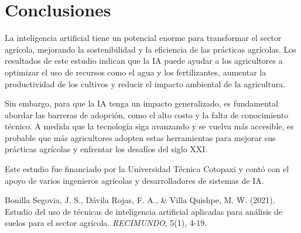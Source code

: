 \documentclass[9pt,twocolumn,twoside]{opticajnl}
\begin{document}
\section{Conclusiones}
La inteligencia artificial tiene un potencial enorme para transformar el sector agrícola, mejorando la sostenibilidad y la eficiencia de las prácticas agrícolas. Los resultados de este estudio indican que la IA puede ayudar a los agricultores a optimizar el uso de recursos como el agua y los fertilizantes, aumentar la productividad de los cultivos y reducir el impacto ambiental de la agricultura.

Sin embargo, para que la IA tenga un impacto generalizado, es fundamental abordar las barreras de adopción, como el alto costo y la falta de conocimiento técnico. A medida que la tecnología siga avanzando y se vuelva más accesible, es probable que más agricultores adopten estas herramientas para mejorar sus prácticas agrícolas y enfrentar los desafíos del siglo XXI.

\begin{backmatter}
Este estudio fue financiado por la Universidad Técnica Cotopaxi y contó con el apoyo de varios ingenieros agrícolas y desarrolladores de sistemas de IA.

Bonilla Segovia, J. S., Dávila Rojas, F. A., \& Villa Quishpe, M. W. (2021). Estudio del uso de técnicas de inteligencia artificial aplicadas para análisis de suelos para el sector agrícola. \emph{RECIMUNDO}, 5(1), 4-19.

\end{backmatter}
\end{document}
